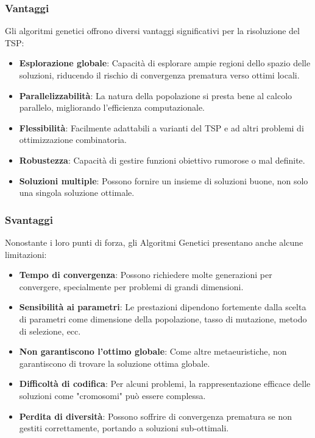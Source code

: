 \subsubsection{Vantaggi}

Gli algoritmi genetici offrono diversi vantaggi significativi per la risoluzione del \gls{TSP}:

\begin{itemize}
	\item \textbf{Esplorazione globale}: Capacità di esplorare ampie regioni dello spazio delle soluzioni, riducendo il rischio di convergenza prematura verso ottimi locali.
	\item \textbf{Parallelizzabilità}: La natura della popolazione si presta bene al calcolo parallelo, migliorando l'efficienza computazionale.
	\item \textbf{Flessibilità}: Facilmente adattabili a varianti del \gls{TSP} e ad altri problemi di ottimizzazione combinatoria.
	\item \textbf{Robustezza}: Capacità di gestire funzioni obiettivo rumorose o mal definite.
	\item \textbf{Soluzioni multiple}: Possono fornire un insieme di soluzioni buone, non solo una singola soluzione ottimale.
\end{itemize}

\subsubsection{Svantaggi}

Nonostante i loro punti di forza, gli Algoritmi Genetici presentano anche alcune limitazioni:

\begin{itemize}
	\item \textbf{Tempo di convergenza}: Possono richiedere molte generazioni per convergere, specialmente per problemi di grandi dimensioni.
	\item \textbf{Sensibilità ai parametri}: Le prestazioni dipendono fortemente dalla scelta di parametri come dimensione della popolazione, tasso di mutazione, metodo di selezione, ecc.
	\item \textbf{Non garantiscono l'ottimo globale}: Come altre metaeuristiche, non garantiscono di trovare la soluzione ottima globale.
	\item \textbf{Difficoltà di codifica}: Per alcuni problemi, la rappresentazione efficace delle soluzioni come "cromosomi" può essere complessa.
	\item \textbf{Perdita di diversità}: Possono soffrire di convergenza prematura se non gestiti correttamente, portando a soluzioni sub-ottimali.
\end{itemize}

